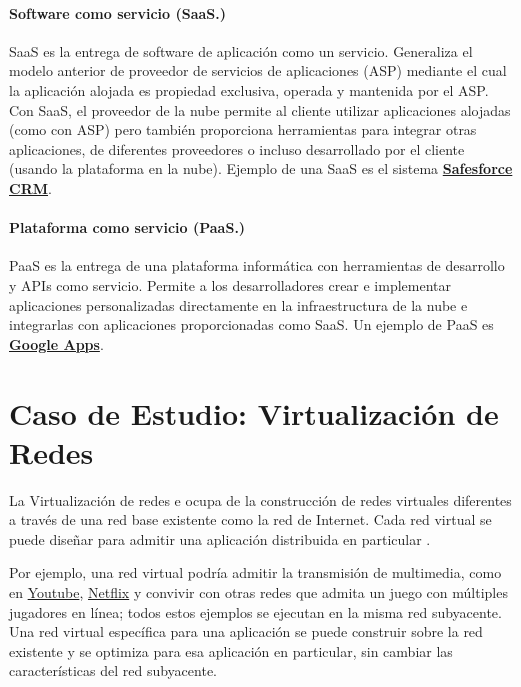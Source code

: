 {\paragraph{Software como servicio (SaaS.)} SaaS es la entrega de software de aplicación como  un servicio. Generaliza el modelo anterior de proveedor de servicios de aplicaciones (ASP)  mediante el cual la aplicación alojada es propiedad exclusiva, operada y mantenida por el  ASP. Con SaaS, el proveedor de la nube permite al cliente utilizar aplicaciones alojadas
 (como con ASP) pero también proporciona herramientas para integrar otras aplicaciones, de diferentes  proveedores o incluso desarrollado por el cliente (usando la plataforma en la nube).
 Ejemplo de una SaaS   es el sistema \textbf{\href{https://www.salesforce.com/mx/?ir=1}{Safesforce CRM}}.
 
 \paragraph{Plataforma como servicio (PaaS.)} PaaS es la entrega de una plataforma informática  con herramientas de desarrollo y APIs como servicio. Permite a los desarrolladores crear  e implementar aplicaciones personalizadas directamente en la infraestructura de la nube e integrarlas con aplicaciones proporcionadas como SaaS. Un ejemplo de  PaaS   es \textbf{\href{https://play.google.com/store/apps?hl=es_VE&gl=US}{Google Apps}}.
 
 \section{Caso de Estudio: Virtualización de Redes}
 \label{sec:redes-sup}
 
La Virtualización de redes  e ocupa de la construcción de  redes virtuales diferentes a través de una red base existente como la red de Internet. Cada  red virtual se puede diseñar para admitir una aplicación distribuida en particular .
 
 Por ejemplo, una red virtual podría admitir la transmisión de multimedia, como en \href{https://www.youtube.com/}{Youtube}, 
 \href{https://www.netflix.com/ve/}{Netflix}    y convivir con otras redes que admita un juego con múltiples jugadores  en línea; todos estos ejemplos se ejecutan en la misma red subyacente. Una red virtual específica para una aplicación se puede construir sobre la red existente y
 se optimiza para esa aplicación en particular, sin cambiar las características del red subyacente. 
 
}
